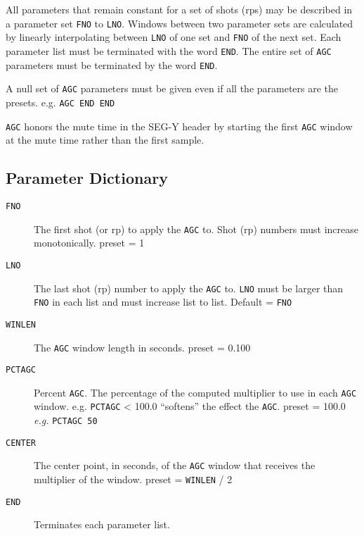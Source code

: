 All parameters that remain constant for a set of \glspl{shot} (\glspl{rp}) may be described
in a parameter set \texttt{FNO} to \texttt{LNO}.  Windows between two parameter
sets are calculated by linearly interpolating between \texttt{LNO} of one set
and \texttt{FNO} of the next set.  Each parameter list must be terminated with
the word \texttt{END}.  The entire set of \texttt{AGC} parameters must be
terminated by the word \texttt{END}.

A null set of \texttt{AGC} parameters must be given even if all the parameters
are the presets.  e.g.  \texttt{AGC END END}

\texttt{AGC} honors the mute time in the SEG-Y header by starting the first
\texttt{AGC} window at the mute time rather than the first sample.

\subsection{Parameter Dictionary}

\begin{description}
\item[\texttt{FNO}] The first \gls{shot} (or \gls{rp}) to apply the \texttt{AGC} to.  Shot
    (\gls{rp}) numbers must increase monotonically.  \Gls{preset} = 1

\item[\texttt{LNO}] The last \gls{shot} (\gls{rp}) number to apply the \texttt{AGC} to.
    \texttt{LNO} must be larger than \texttt{FNO} in each list and must
    increase list to list.  Default = \texttt{FNO}

\item[\texttt{WINLEN}] The \texttt{AGC} window length in seconds.  \Gls{preset} = 0.100

\item[\texttt{PCTAGC}] Percent \texttt{AGC}.  The percentage of the computed
    multiplier to use in each \texttt{AGC} window. e.g. \texttt{PCTAGC} < 100.0
    ``softens'' the effect the \texttt{AGC}.  \Gls{preset} = 100.0  \textit{e.g.}
    \texttt{PCTAGC 50}

\item[\texttt{CENTER}] The center point, in seconds, of the \texttt{AGC} window
    that receives the multiplier of the window.  \Gls{preset} = \texttt{WINLEN} / 2

\item[\texttt{END}] Terminates each parameter list.
\end{description}

